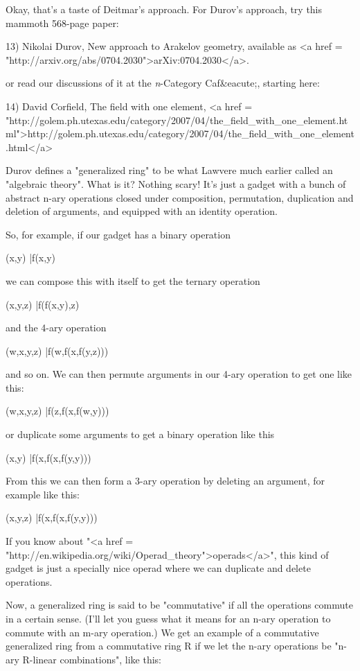 Okay, that's a taste of Deitmar's approach.  For Durov's approach, 
try this mammoth 568-page paper:

13) Nikolai Durov, New approach to Arakelov geometry, available as
<a href = "http://arxiv.org/abs/0704.2030">arXiv:0704.2030</a>.

or read our discussions of it at the \emph{n}-Category Caf&eacute;, 
starting here:

14) David Corfield, The field with one element, 
<a href = "http://golem.ph.utexas.edu/category/2007/04/the_field_with_one_element.html">http://golem.ph.utexas.edu/category/2007/04/the_field_with_one_element.html</a>

Durov defines a "generalized ring" to be what Lawvere much
earlier called an "algebraic theory".  What is it?  Nothing
scary!  It's just a gadget with a bunch of abstract n-ary operations
closed under composition, permutation, duplication and deletion of
arguments, and equipped with an identity operation.

So, for example, if our gadget has a binary operation 

(x,y) |\to  f(x,y)

we can compose this with itself to get the ternary operation

(x,y,z) |\to  f(f(x,y),z)

and the 4-ary operation

(w,x,y,z) |\to  f(w,f(x,f(y,z)))

and so on.  We can then permute arguments in our 4-ary operation
to get one like this:

(w,x,y,z) |\to  f(z,f(x,f(w,y)))

or duplicate some arguments to get a binary operation like this

(x,y) |\to  f(x,f(x,f(y,y)))

From this we can then form a 3-ary operation by deleting an argument,
for example like this:

(x,y,z) |\to  f(x,f(x,f(y,y)))

If you know about 
"<a href = "http://en.wikipedia.org/wiki/Operad_theory">operads</a>",
this kind of gadget is just a specially 
nice operad where we can duplicate and delete operations.  
 
Now, a generalized ring is said to be "commutative" if all the 
operations commute in a certain sense.  (I'll let you guess what
it means for an n-ary operation to commute with an m-ary operation.)
We get an example of a commutative generalized ring from a commutative 
ring R if we let the n-ary operations be "n-ary R-linear 
combinations", like this:

